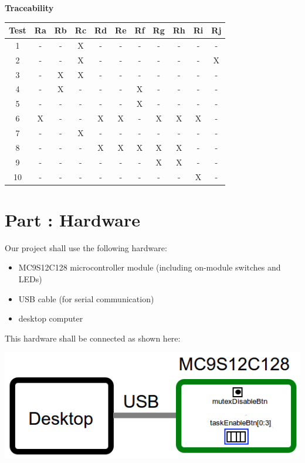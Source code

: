 \documentclass{article}
\newcounter{partNum}
\newcommand{\partNum}{%
        \stepcounter{partNum}%
        \thepartNum}
\newcommand{\sectPart}[1]{\section*{Part \partNum: #1}}
\begin{document}
\begin{center}
    \textbf{Traceability} \\
    \vspace{0.5em}
    \begin{tabular}{| c | c | c | c | c | c | c | c | c | c | c |}
    \hline
    Test & Ra & Rb & Rc & Rd & Re & Rf & Rg & Rh & Ri & Rj \\ \hline
    1    & -  & -  & X  & -  & -  & -  & -  & -  & -  & -  \\ \hline
    2    & -  & -  & X  & -  & -  & -  & -  & -  & -  & X  \\ \hline
    3    & -  & X  & X  & -  & -  & -  & -  & -  & -  & -  \\ \hline
    4    & -  & X  & -  & -  & -  & X  & -  & -  & -  & -  \\ \hline
    5    & -  & -  & -  & -  & -  & X  & -  & -  & -  & -  \\ \hline
    6    & X  & -  & -  & X  & X  & -  & X  & X  & X  & -  \\ \hline
    7    & -  & -  & X  & -  & -  & -  & -  & -  & -  & -  \\ \hline
    8    & -  & -  & -  & X  & X  & X  & X  & X  & -  & -  \\ \hline
    9    & -  & -  & -  & -  & -  & -  & X  & X  & -  & -  \\ \hline
    10   & -  & -  & -  & -  & -  & -  & -  & -  & X  & -  \\ \hline
    \end{tabular}
\end{center}


\newpage

\sectPart{Hardware}

Our project shall use the following hardware:
\begin{itemize}
    \item MC9S12C128 microcontroller module (including on-module switches and LEDs)
    \item USB cable (for serial communication)
    \item desktop computer
\end{itemize}
This hardware shall be connected as shown here:\\

\begin{center}
    \includegraphics[scale=0.5]{hardware.png}
\end{center}
\end{document}
